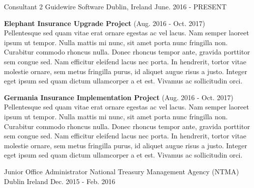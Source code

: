 

\begin{cventries}

    
      \cventry
    {Consultant 2} %
    {Guidewire Software} %
    {Dublin, Ireland} %
    {June. 2016 - PRESENT} %
    {
    \begin{cvitems} %
        \item {\textbf{\footnotesize{Elephant Insurance Upgrade Project}} {\tiny (Aug. 2016 - Oct. 2017)} {\\}
Pellentesque sed quam vitae erat ornare egestas ac vel lacus. Nam semper laoreet ipsum ut tempor. Nulla mattis mi nunc, sit amet porta nunc fringilla non. Curabitur commodo rhoncus nulla. Donec rhoncus tempor ante, gravida porttitor sem congue sed. Nam efficitur eleifend lacus nec porta. In hendrerit, tortor vitae molestie ornare, sem metus fringilla purus, id aliquet augue risus a justo. Integer eget ipsum sed quam dictum ullamcorper a et est. Vivamus ac sollicitudin orci.}
    \item {\textbf{\footnotesize{Germania Insurance Implementation Project}} {\tiny (Aug. 2016 - Oct. 2017)} {\\}
    Pellentesque sed quam vitae erat ornare egestas ac vel lacus. Nam semper laoreet ipsum ut tempor. Nulla mattis mi nunc, sit amet porta nunc fringilla non. Curabitur commodo rhoncus nulla. Donec rhoncus tempor ante, gravida porttitor sem congue sed. Nam efficitur eleifend lacus nec porta. In hendrerit, tortor vitae molestie ornare, sem metus fringilla purus, id aliquet augue risus a justo. Integer eget ipsum sed quam dictum ullamcorper a et est. Vivamus ac sollicitudin orci.}
      \end{cvitems}
    }
  \cventry
    {Junior Office Administrator} %
    {National Treasury Management Agency (NTMA)} %
    {Dublin Ireland} %
    {Dec. 2015 - Feb. 2016} %
    {
      \begin{cvitems} %

\end{cvitems}}
\end{cventries}
